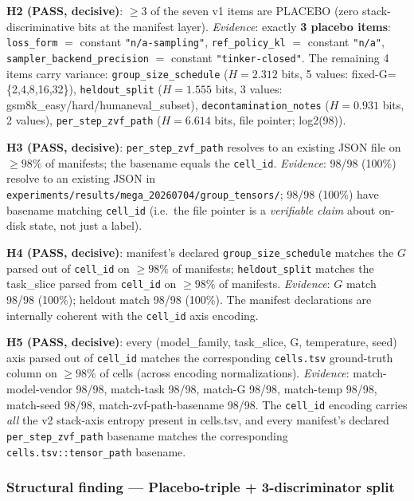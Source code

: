 \documentclass{article}  \usepackage[preprint,nonatbib]{neurips_2026} \usepackage[numbers]{natbib}
\begin{document}
\textbf{H2 (PASS, decisive)}: $\ge 3$ of the seven v1 items are PLACEBO (zero stack-discriminative bits at the manifest layer). \emph{Evidence}: exactly \textbf{3 placebo items}: \texttt{loss\_form} $=$ constant \texttt{"n/a-sampling"}, \texttt{ref\_policy\_kl} $=$ constant \texttt{"n/a"}, \texttt{sampler\_backend\_precision} $=$ constant \texttt{"tinker-closed"}. The remaining 4 items carry variance: \texttt{group\_size\_schedule} ($H{=}2.312$ bits, 5 values: fixed-G=\{2,4,8,16,32\}), \texttt{heldout\_split} ($H{=}1.555$ bits, 3 values: gsm8k\_easy/hard/humaneval\_subset), \texttt{decontamination\_notes} ($H{=}0.931$ bits, 2 values), \texttt{per\_step\_zvf\_path} ($H{=}6.614$ bits, file pointer; log2(98)).

\textbf{H3 (PASS, decisive)}: \texttt{per\_step\_zvf\_path} resolves to an existing JSON file on $\ge 98\%$ of manifests; the basename equals the \texttt{cell\_id}. \emph{Evidence}: 98/98 (100\%) resolve to an existing JSON in \texttt{experiments/results/mega\_20260704/group\_tensors/}; 98/98 (100\%) have basename matching \texttt{cell\_id} (i.e.\ the file pointer is a \emph{verifiable claim} about on-disk state, not just a label).

\textbf{H4 (PASS, decisive)}: manifest's declared \texttt{group\_size\_schedule} matches the $G$ parsed out of \texttt{cell\_id} on $\ge 98\%$ of manifests; \texttt{heldout\_split} matches the task\_slice parsed from \texttt{cell\_id} on $\ge 98\%$ of manifests. \emph{Evidence}: $G$ match 98/98 (100\%); heldout match 98/98 (100\%). The manifest declarations are internally coherent with the \texttt{cell\_id} axis encoding.

\textbf{H5 (PASS, decisive)}: every (model\_family, task\_slice, G, temperature, seed) axis parsed out of \texttt{cell\_id} matches the corresponding \texttt{cells.tsv} ground-truth column on $\ge 98\%$ of cells (across encoding normalizations). \emph{Evidence}: match-model-vendor 98/98, match-task 98/98, match-G 98/98, match-temp 98/98, match-seed 98/98, match-zvf-path-basename 98/98. The \texttt{cell\_id} encoding carries \emph{all} the v2 stack-axis entropy present in cells.tsv, and every manifest's declared \texttt{per\_step\_zvf\_path} basename matches the corresponding \texttt{cells.tsv::tensor\_path} basename.

\subsubsection{Structural finding --- Placebo-triple + 3-discriminator split}
\label{sec:p5-iter169-placebo-triple}
\end{document}
